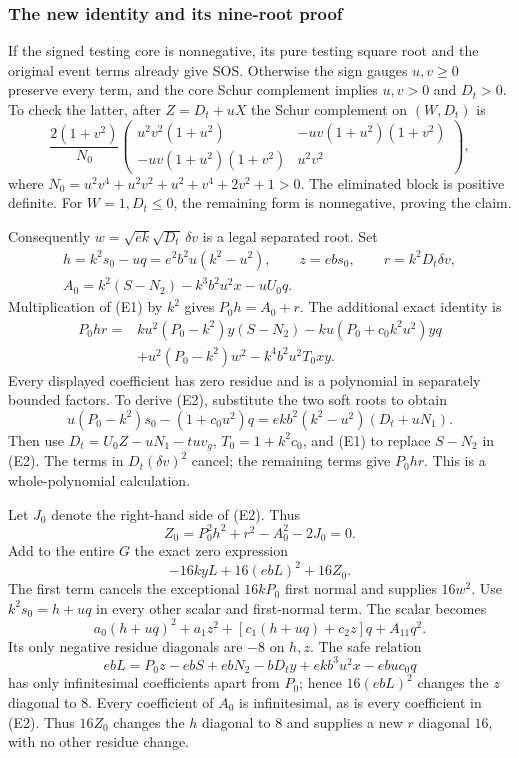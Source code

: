 \subsubsection*{The new identity and its nine-root proof}
If the signed testing core is nonnegative, its pure testing square root and the original event terms already give SOS. Otherwise the sign gauges $u,v\ge0$ preserve every term, and the core Schur complement implies $u,v>0$ and $D_t>0$. To check the latter, after $Z=D_t+uX$ the Schur complement on $(W,D_t)$ is
\[
\frac{2(1+v^2)}{N_0}
\begin{pmatrix}
u^2v^2(1+u^2)&-uv(1+u^2)(1+v^2)\\
-uv(1+u^2)(1+v^2)&u^2v^2
\end{pmatrix},
\]
where $N_0=u^2v^4+u^2v^2+u^2+v^4+2v^2+1>0$. The eliminated block is positive definite. For $W=1,D_t\le0$, the remaining form is nonnegative, proving the claim.

Consequently $w=\sqrt{ek}\sqrt{D_t}\,\delta v$ is a legal separated root. Set
\begin{gather*}
h=k^2s_0-uq=e^2b^2u(k^2-u^2),\qquad z=ebs_0,\qquad r=k^2D_t\delta v,\\
A_0=k^2(S-N_2)-k^3b^2u^2x-uU_0q.
\end{gather*}
Multiplication of (E1) by $k^2$ gives $P_0h=A_0+r$. The additional exact identity is
\begin{align*}
P_0hr={}&ku^2(P_0-k^2)y(S-N_2)
-ku(P_0+c_0k^2u^2)yq\\
&+u^2(P_0-k^2)w^2-k^4b^2u^2T_0xy. \tag{E2}
\end{align*}
Every displayed coefficient has zero residue and is a polynomial in separately bounded factors. To derive (E2), substitute the two soft roots to obtain
\[
u(P_0-k^2)s_0-(1+c_0u^2)q
=ekb^2(k^2-u^2)(D_t+uN_1).
\]
Then use $D_t=U_0Z-uN_1-tu v_g$, $T_0=1+k^2c_0$, and (E1) to replace $S-N_2$ in (E2). The terms in $D_t(\delta v)^2$ cancel; the remaining terms give $P_0hr$. This is a whole-polynomial calculation.

Let $J_0$ denote the right-hand side of (E2). Thus
\[
Z_0=P_0^2h^2+r^2-A_0^2-2J_0=0.
\]
Add to the entire $G$ the exact zero expression
\[
-16kyL+16(ebL)^2+16Z_0.
\]
The first term cancels the exceptional $16kP_0$ first normal and supplies $16w^2$. Use $k^2s_0=h+uq$ in every other scalar and first-normal term. The scalar becomes
\[
a_0(h+uq)^2+a_1z^2+[c_1(h+uq)+c_2z]q+A_{11}q^2.
\]
Its only negative residue diagonals are $-8$ on $h,z$. The safe relation
\[
ebL=P_0z-ebS+ebN_2-bD_ty+ekb^3u^2x-ebu c_0q
\]
has only infinitesimal coefficients apart from $P_0$; hence $16(ebL)^2$ changes the $z$ diagonal to $8$. Every coefficient of $A_0$ is infinitesimal, as is every coefficient in (E2). Thus $16Z_0$ changes the $h$ diagonal to $8$ and supplies a new $r$ diagonal $16$, with no other residue change.

